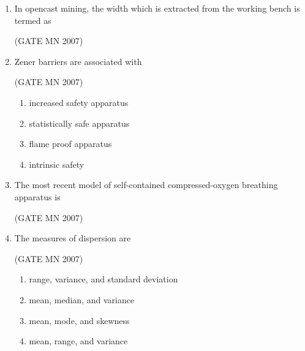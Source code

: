 \documentclass[journal]{IEEEtran}
\begin{document}
\begin{enumerate}
\item In opencast mining, the width which is extracted from the working bench is termed as


	\hfill (GATE MN 2007)
\begin{enumerate}
\end{enumerate}


\item Zener barriers are associated with


	\hfill (GATE MN 2007)
\begin{enumerate}
		
    \item increased safety apparatus
    \item statistically safe apparatus
    \item flame proof apparatus
    \item intrinsic safety
	    
\end{enumerate}


\item The most recent model of self-contained compressed-oxygen breathing apparatus is


	\hfill (GATE MN 2007)
\begin{enumerate}
\end{enumerate}



\item The measures of dispersion are


	\hfill (GATE MN 2007)
\begin{enumerate}
    \item range, variance, and standard deviation
    \item mean, median, and variance
    \item mean, mode, and skewness
    \item mean, range, and variance


\end{enumerate}
\end{enumerate}
\end{document}
